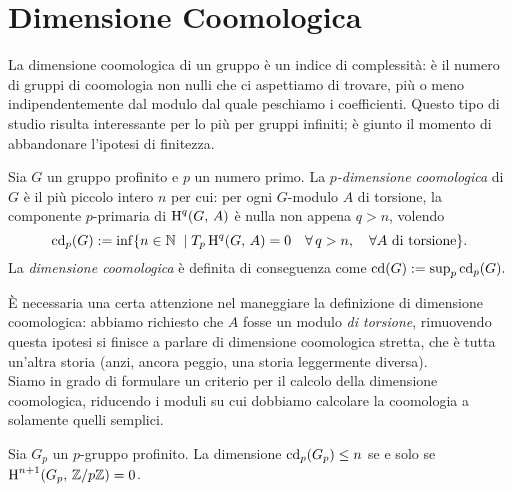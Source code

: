 \section{Dimensione Coomologica}
La dimensione coomologica di un gruppo è un indice di complessità: è il numero di gruppi di coomologia non nulli che ci aspettiamo di trovare, più o meno indipendentemente dal modulo dal quale peschiamo i coefficienti. Questo tipo di studio risulta interessante per lo più per gruppi infiniti; è giunto il momento di abbandonare l'ipotesi di finitezza.
\begin{definition}
	Sia $ G $ un gruppo profinito e $ p $ un numero primo. La \emph{$ p $-dimensione coomologica} di $ G $ è il più piccolo intero $ n $ per cui: per ogni $ G $-modulo $ A $ di torsione, la componente $ p $-primaria di $ \operatorname{H}^q(G, \, A) $ è nulla non appena $ q > n $, volendo
	\[ \operatorname{cd}_p(G) := \inf \{ n \in \mathbb{N} \; \mid T_p\operatorname{H}^q(G, \, A)=0\quad \forall \, q > n, \quad \forall A \text{ di torsione} \}. \]
	La \emph{dimensione coomologica} è definita di conseguenza come $ \operatorname{cd}(G) := \sup_p \operatorname{cd}_p(G). $
\end{definition}

È necessaria una certa attenzione nel maneggiare la definizione di dimensione coomologica: abbiamo richiesto che $ A $ fosse un modulo \emph{di torsione}, rimuovendo questa ipotesi si finisce a parlare di dimensione coomologica stretta, che è tutta un'altra storia (anzi, ancora peggio, una storia leggermente diversa). \\

Siamo in grado di formulare un criterio per il calcolo della dimensione coomologica, riducendo i moduli su cui dobbiamo calcolare la coomologia a solamente quelli semplici.

\begin{proposition}
	Sia $ G_p $ un $ p $-gruppo profinito. La dimensione $ \operatorname{cd}_p(G_p) \leq n $ se e solo se $ \operatorname{H}^{n+1}(G_p, \, \mathbb{Z}/p\mathbb{Z}) = 0 $. 
\end{proposition}

